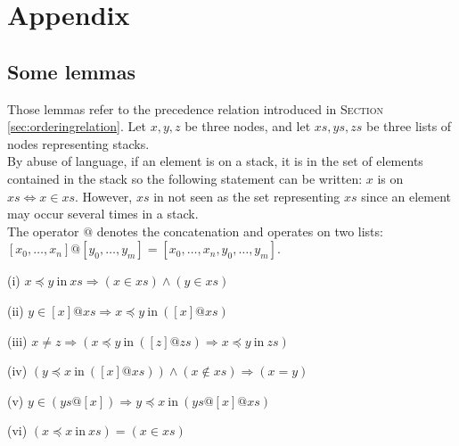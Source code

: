 \documentclass[a4 paper, 12pt]{article}
\theoremstyle{definition}
\begin{document}
\pagebreak

\section{Appendix}\label{appendix}
\subsection{Some lemmas}
Those lemmas refer to the precedence relation introduced in \textsc{Section} \ref{sec:orderingrelation}.
\BlankLine
Let $x, y, z$ be three nodes, and let $xs, ys, zs$ be three lists of nodes representing stacks.\\
By abuse of language, if an element is on a stack, it is in the set of elements contained in the stack so the following statement can be written: $x$ is on $xs \Longleftrightarrow x \in xs$. However, $xs$ in not seen as the set representing $xs$ since an element may occur several times in a stack.\\
The operator $@$ denotes the concatenation and operates on two lists: $[x_0, \dots, x_n] @ [y_0, \dots, y_m] = [x_0, \dots, x_n, y_0, \dots, y_m]$.\\

\begin{flushleft}
    (i)
$x \preceq y~\text{in}~xs \Longrightarrow (x \in xs)\wedge(y \in xs)$
\end{flushleft}
\begin{flushleft}
    (ii)
$y \in [x] @ xs \Longrightarrow x \preceq y~\text{in}~([x] @ xs)$
\end{flushleft}

\begin{flushleft}
    (iii)
    $x \neq z \Longrightarrow (x \preceq y~\text{in}~([z] @ zs) \Longrightarrow x \preceq y ~\text{in}~zs)$
\end{flushleft}

\begin{flushleft}
    (iv)
    $(y \preceq x~\text{in}~([x] @ xs)) \wedge (x \notin xs) \Longrightarrow (x = y)$
\end{flushleft}

\begin{flushleft}
    (v)
    $y \in (ys @ [x]) \Longrightarrow y \preceq x~\text{in}~(ys @ [x] @ xs)$
\end{flushleft} 

\begin{flushleft}
    (vi)
    $(x \preceq x~\text{in}~xs) = (x \in xs)$
\end{flushleft}
\end{document}
